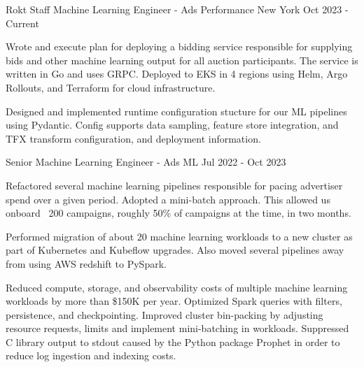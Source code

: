 

\begin{cventries}
\cventrywide
  {Rokt} %
  {Staff Machine Learning Engineer - Ads Performance} %
  {New York} %
  {Oct 2023 - Current} %
  {
    \begin{cvitems} %
      \item {Wrote and execute plan for deploying a bidding service responsible for supplying bids and other machine learning output for all auction participants. The service is written in Go and uses GRPC. Deployed to EKS in 4 regions using Helm, Argo Rollouts, and Terraform for cloud infrastructure. }
      \item {Designed and implemented runtime configuration stucture for our ML pipelines using Pydantic. Config supports data sampling, feature store integration, and TFX transform configuration, and deployment information. }
    \end{cvitems}
  }

\cventrywide
  {Senior Machine Learning Engineer - Ads ML} %
  {}
  {}
  {Jul 2022 - Oct 2023} %
  {
    \begin{cvitems} %
      \item {Refactored several machine learning pipelines responsible for pacing advertiser spend over a given period. Adopted a mini-batch approach. This allowed us onboard ~200 campaigns, roughly 50\% of campaigns at the time, in two months. }
      \item {Performed migration of about 20 machine learning workloads to a new cluster as part of Kubernetes and Kubeflow upgrades. Also moved several pipelines away from using AWS redshift to PySpark. }
      \item {Reduced compute, storage, and observability costs of multiple machine learning workloads by more than \$150K per year. Optimized Spark queries with filters, persistence, and checkpointing. Improved cluster bin-packing by adjusting resource requests, limits and implement mini-batching in workloads. Suppressed C library output to stdout caused by the Python package Prophet in order to reduce log ingestion and indexing costs. }
    \end{cvitems}
  }


\end{cventries}
